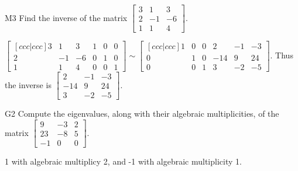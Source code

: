 \documentclass{sbgLAquiz}
\begin{document}
\begin{extract}\newpage\end{extract}
\begin{problem}{M3}
  Find the inverse of the matrix
  \(\begin{bmatrix}
    3 & 1 & 3  \\
    2 & -1 & -6  \\
    1 & 1 & 4
  \end{bmatrix}\).
\end{problem}
\begin{solution}
\(\begin{bmatrix}[ccc|ccc]
  3 & 1 & 3 & 1 & 0 & 0 \\
  2 & -1 & -6 & 0 & 1 & 0 \\
  1 & 1 & 4 & 0 & 0 & 1
\end{bmatrix}\sim\begin{bmatrix}[ccc|ccc]
  1 & 0 & 0 & 2 & -1 & -3  \\
  0 & 1 & 0 & -14 & 9 & 24  \\
  0 & 0 & 1 & 3 & -2 & -5
\end{bmatrix}\). Thus the inverse is
\(\begin{bmatrix}
  2 & -1 & -3  \\
  -14 & 9 & 24  \\
  3 & -2 & -5
\end{bmatrix}\).
\end{solution}


\begin{problem}{G2} 
Compute the eigenvalues, along with their algebraic multiplicities, of the matrix $ \begin{bmatrix} 9 & -3 & 2 \\ 23 & -8 & 5 \\  -1 & 0 & 0 \end{bmatrix}$.
\end{problem}
\begin{solution}
1 with algebraic multiplicy 2, and -1 with algebraic multiplicity 1.
\end{solution}
\end{document}
